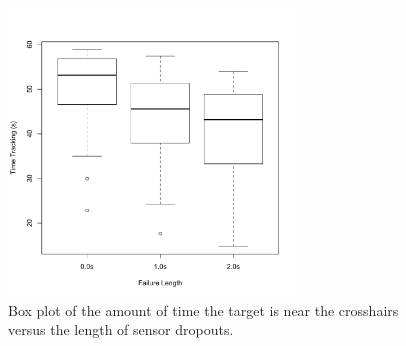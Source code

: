 \documentclass{acmsiggraph}                     %
\begin{document}



\begin{figure}[t]
	\centering
	\includegraphics[width=3in]{figures/tt_deadlen.pdf}
	\caption{\label{fig:tt_deadlen}Box plot of the amount of time the target is near the crosshairs versus the length of sensor dropouts.}
\end{figure}


\end{document}
